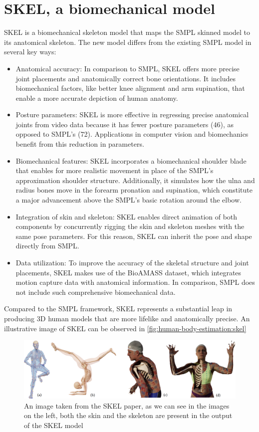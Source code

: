 \section{SKEL, a biomechanical model}
SKEL\cite{keller2023skel} is a biomechanical skeleton model that maps the SMPL skinned model to its anatomical skeleton. The new model differs from the existing SMPL model in several key ways:
\begin{itemize}
    \item Anatomical accuracy: In comparison to SMPL, SKEL offers more precise joint placements and anatomically correct bone orientations. It includes biomechanical factors, like better knee alignment and arm supination, that enable a more accurate depiction of human anatomy.
    \item Posture parameters: SKEL is more effective in regressing precise anatomical joints from video data because it has fewer posture parameters (46), as opposed to SMPL's (72). Applications in computer vision and biomechanics benefit from this reduction in parameters.
    \item Biomechanical features: SKEL incorporates a biomechanical shoulder blade that enables for more realistic movement in place of the SMPL's approximation shoulder structure. Additionally, it simulates how the ulna and radius bones move in the forearm pronation and supination, which constitute a major advancement above the SMPL's basic rotation around the elbow.
    \item Integration of skin and skeleton: SKEL enables direct animation of both components by concurrently rigging the skin and skeleton meshes with the same pose parameters. For this reason, SKEL can inherit the pose and shape directly from SMPL.
    \item Data utilization: To improve the accuracy of the skeletal structure and joint placements, SKEL makes use of the BioAMASS dataset, which integrates motion capture data with anatomical information. In comparison, SMPL does not include such comprehensive biomechanical data.
\end{itemize}

Compared to the SMPL framework, SKEL represents a substantial leap in producing 3D human models that are more lifelike and anatomically precise. An illustrative image of SKEL can be observed in \autoref{fig:human-body-estimation:skel} 
\begin{figure}[H]
    \centering   \includegraphics[width=0.7\linewidth]{images/skel.png}
    \caption{An image taken from the SKEL paper, as we can see in the images on the left, both the skin and the skeleton are present in the output of the SKEL model}
    \label{fig:human-body-estimation:skel}
\end{figure}
